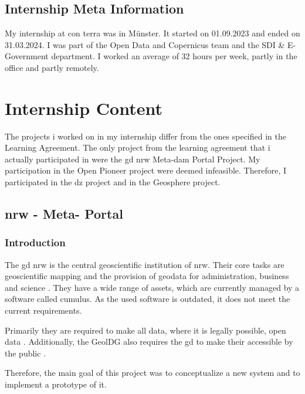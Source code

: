 \documentclass[11pt, titlepage, a4paper]{article}
\begin{document}
\subsection{Internship Meta Information}

My internship at con terra was in Münster. It started on 01.09.2023 and ended on 31.03.2024. I was part of the Open Data and Copernicus team and the SDI \& E-Government department. I worked an average of 32 hours per week, partly in the office and partly remotely.

\section{Internship Content}
The projects i worked on in my internship differ from the ones specified in the Learning Agreement. The only project from the learning agreement that i actually participated in were the \gls{gd} \gls{nrw} Meta-\gls{dam} Portal Project. My participation in the Open Pioneer project were deemed infeasible. Therefore, I participated in the \gls {dz} project and in the Geosphere project.

\subsection{ \gls{nrw} -  Meta- Portal }
\subsubsection{Introduction}
The  \gls {gd} \gls {nrw}  is the central geoscientific institution of \gls {nrw}. Their  core tasks are geoscientific mapping and the provision of geodata for administration, business and science \cite{GeoDatenFurNordrheinWestfalen2024}.
They have a wide range of assets, which are currently managed by a software called cumulus. As the used software is outdated, it does not meet the current requirements.

Primarily they  are required to make all data, where it is legally possible, open data \cite{GesetzZurForderung2017}.
Additionally, the GeolDG also requires the \gls{gd} to make their accessible by the public \cite{GesetzZurStaatlichen2020}.

Therefore, the main goal of this project was to conceptualize a new system and to implement a prototype of it.
\end{document}
